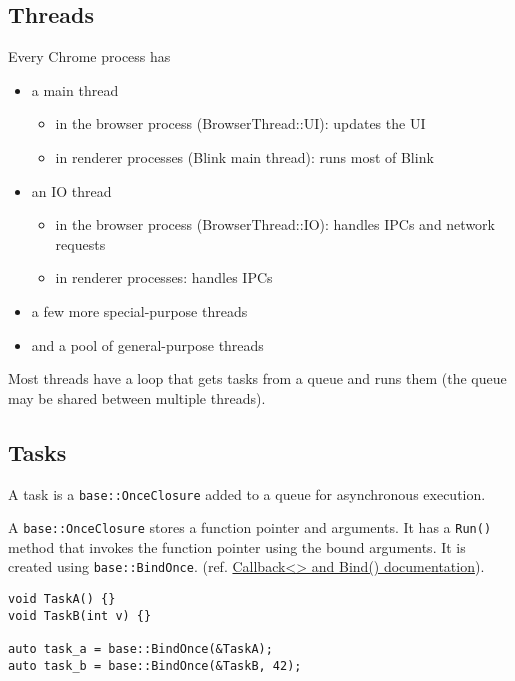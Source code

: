\documentclass[a4paper,12pt,notitlepage,twoside,openright]{article}
\begin{document}
\hypertarget{threads}{%
\subsection{Threads}\label{threads}}

Every Chrome process has

\begin{itemize}
\item
  a main thread

  \begin{itemize}
  \item
    in the browser process (BrowserThread::UI): updates the UI
  \item
    in renderer processes (Blink main thread): runs most of Blink
  \end{itemize}
\item
  an IO thread

  \begin{itemize}
  \item
    in the browser process (BrowserThread::IO): handles IPCs and network
    requests
  \item
    in renderer processes: handles IPCs
  \end{itemize}
\item
  a few more special-purpose threads
\item
  and a pool of general-purpose threads
\end{itemize}

Most threads have a loop that gets tasks from a queue and runs them (the
queue may be shared between multiple threads).

\hypertarget{tasks}{%
\subsection{Tasks}\label{tasks}}

A task is a \texttt{base::OnceClosure} added to a queue for asynchronous
execution.

A \texttt{base::OnceClosure} stores a function pointer and arguments. It
has a \texttt{Run()} method that invokes the function pointer using the
bound arguments. It is created using \texttt{base::BindOnce}. (ref.
\href{callback.md}{Callback\textless\textgreater{} and Bind()
documentation}).

\begin{verbatim}
void TaskA() {}
void TaskB(int v) {}

auto task_a = base::BindOnce(&TaskA);
auto task_b = base::BindOnce(&TaskB, 42);
\end{verbatim}
\end{document}
